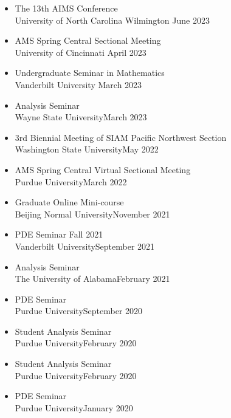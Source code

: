 \documentclass[12pt]{article}
\newenvironment{innerlist}[1][\enskip\textbullet]%
        {\begin{itemize}[#1,leftmargin=*,parsep=0pt,itemsep=0pt,topsep=0pt,partopsep=0pt]}
        {\end{itemize}}
\begin{document}
\begin{innerlist}
Old Dominion University \hfill September 2023
\item The 13th AIMS Conference \\
University of North Carolina Wilmington \hfill June 2023
\item AMS Spring Central Sectional Meeting\\
University of Cincinnati \hfill April 2023
\item Undergraduate Seminar in Mathematics\\
Vanderbilt University \hfill March 2023
\item Analysis Seminar\\
Wayne State University\hfill March 2023
\item 3rd Biennial Meeting of SIAM Pacific Northwest Section\\ Washington State University\hfill May 2022

\item AMS Spring Central Virtual Sectional Meeting\\ Purdue University\hfill March 2022

\item Graduate Online Mini-course\\ Beijing Normal University\hfill November 2021

\item PDE Seminar Fall 2021\\ Vanderbilt University\hfill September 2021

\item Analysis Seminar\\ The University of Alabama\hfill February 2021

\item PDE Seminar\\ Purdue University\hfill September 2020

\item Student Analysis Seminar\\ Purdue University\hfill February 2020

\item Student Analysis Seminar\\ Purdue University\hfill February 2020

\item PDE Seminar\\ Purdue University\hfill January 2020



\end{innerlist}
\end{document}
